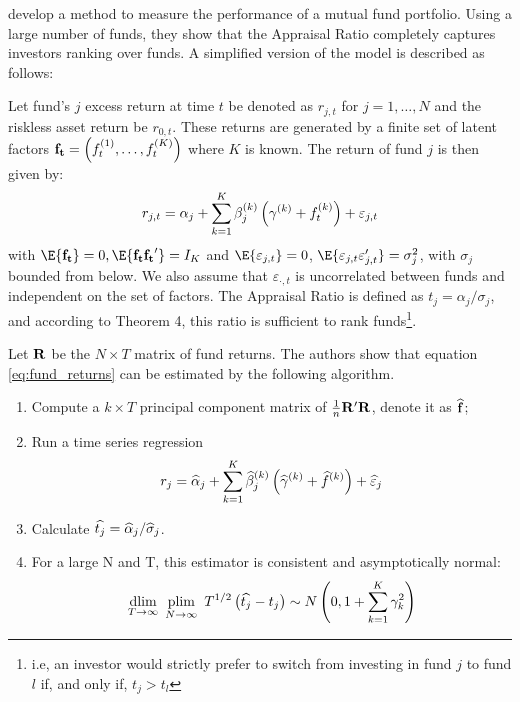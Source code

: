 \citet{connor1986performance} develop a method to measure the performance of a mutual fund portfolio. Using a large number of funds, they show that the \citet{treynor1973use} Appraisal Ratio completely captures investors ranking over funds. A simplified version of the model is described as follows:

Let fund's \(j\) excess return at time \(t\) be denoted as \(r_{j,t}\) for \(j = 1, \dots, N\) and the riskless asset return be \(r_{0,t}\). These returns are generated by a finite set of latent factors \(\mathbf{f_t} = \left( f_t^{(1)}, \dots, f_t^{(K)} \right)\) where \(K\) is known. The return of fund \(j\) is then given by:
\begin{equation}
    \label{eq:fund_returns}
    r_{j,t} = \alpha_j + \sum_{k = 1}^K\beta_j^{(k)}\left( \gamma^{(k)} + f_t^{(k)} \right)    + \varepsilon_{j,t}
\end{equation}
with \(\E{\bf{f_t}} = 0, \E{\bf{f_tf_t}^\prime} = I_K\) and \(\E{\varepsilon_{j,t}} = 0\), \(\E{\varepsilon_{j,t}\varepsilon_{j,t}^\prime} = \sigma_j^2\), with \(\sigma_j\) bounded from below. We also assume that \(\varepsilon_{\cdot, t}\) is uncorrelated between funds and independent on the set of factors.  
The Appraisal Ratio is defined as \(t_j = \alpha_j / \sigma_j\), and according to Theorem 4, this ratio is sufficient to rank funds\footnote{i.e, an investor would strictly prefer to switch from investing in fund \(j\) to fund \(l\) if, and only if, \(t_j > t_l\)}.

Let \(\bf{R}\) be the \(N \times T\) matrix of fund returns. The authors show that equation \eqref{eq:fund_returns} can be estimated by the following algorithm.
\begin{enumerate}[label = \arabic*), leftmargin = *]
    \item Compute a \(k \times T\) principal component matrix of \(\frac{1}{n} \bf{R}^\prime \bf{R}\), denote it as \(\widehat{\bf{f}}\);
    \item Run a time series regression 
    \begin{equation}
        \label{eq:ck_regression}
        r_j = \widehat{\alpha}_j + \sum_{k = 1}^K\widehat{\beta}_j^{(k)}\left( \widehat{\gamma}^{(k)} + \widehat{f}^{(k)} \right) + \widehat{\varepsilon}_j
    \end{equation}
    \item Calculate \(\widehat{t_j} = \widehat{\alpha}_j / \widehat{\sigma}_j\).
    \item For a large N and T, this estimator is consistent and asymptotically normal:
    \begin{equation}
        \label{eq:appraisal_distribution}
        \underset{T \to \infty}{\text{dlim}}\hspace{5pt}\underset{N \to \infty}{\text{plim}}\hspace{5pt} T^{1/2}\left( \widehat{t_j} - t_j \right) \sim N\left( 0, 1 + \sum_{k=1}^K \gamma_k^2 \right)
    \end{equation}
\end{enumerate}

